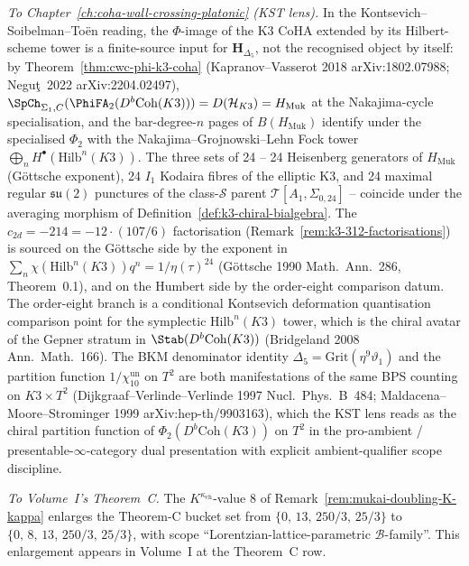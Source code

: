 \emph{To Chapter~\ref{ch:coha-wall-crossing-platonic} (KST lens).}
In the Kontsevich--Soibelman--To\"en reading,
the $\Phi$-image of the K3 CoHA extended by its Hilbert-scheme tower is a
finite-source input for $\mathbf{H}_{\Delta_5}$, not the recognised
object by itself: by
Theorem~\ref{thm:cwc-phi-k3-coha} (Kapranov--Vasserot 2018
\textup{arXiv:1802.07988}; Negu\c{t}~2022 \textup{arXiv:2204.02497}),
$\SpCh_{\Sigma_1, C}(\PhiFA_2(D^b\mathrm{Coh}(K3))) = D(\mathcal{H}_{K3}) = H_{\mathrm{Muk}}$
at the Nakajima-cycle specialisation, and the bar-degree-$n$ pages of $B(H_{\mathrm{Muk}})$ identify under the specialised $\Phi_2$
with the Nakajima--Grojnowski--Lehn Fock tower
$\bigoplus_n H^\bullet(\mathrm{Hilb}^n(K3))$. The three sets of 24 --
24 Heisenberg generators of $H_{\mathrm{Muk}}$ (G\"ottsche exponent),
24 $I_1$ Kodaira fibres of the elliptic K3, and 24 maximal regular
$\mathfrak{su}(2)$ punctures of the class-$\mathcal{S}$ parent
$\mathcal{T}[A_1,\Sigma_{0,24}]$ -- coincide under the averaging
morphism of Definition~\ref{def:k3-chiral-bialgebra}. The
$c_{2d} = -214 = -12\cdot(107/6)$ factorisation
(Remark~\ref{rem:k3-312-factorisations}) is
sourced on the G\"ottsche side by the exponent in
$\sum_n\chi(\mathrm{Hilb}^n(K3))q^n = 1/\eta(\tau)^{24}$
(G\"ottsche 1990 \textup{Math.~Ann.}~286, Theorem~0.1), and on the
Humbert side by the order-eight comparison datum. The
order-eight branch is a conditional Kontsevich deformation
quantisation comparison point for the symplectic
$\mathrm{Hilb}^n(K3)$ tower, which is the chiral avatar of the Gepner
stratum in $\Stab(D^b\mathrm{Coh}(K3))$ (Bridgeland 2008
\textup{Ann.~Math.}~166). The BKM denominator identity
$\Delta_5 = \mathrm{Grit}(\eta^9\vartheta_1)$ and the partition
function \(1/\chi_{10}^{\mathrm{un}}\) on $T^2$ are both manifestations of the
same BPS counting on $K3\times T^2$
(Dijkgraaf--Verlinde--Verlinde 1997 \textup{Nucl.~Phys.~B}~484;
Maldacena--Moore--Strominger 1999
\textup{arXiv:hep-th/9903163}), which the KST lens reads as the
chiral partition function of $\Phi_2(D^b\mathrm{Coh}(K3))$ on $T^2$
in the pro-ambient / presentable-$\infty$-category dual presentation
with explicit ambient-qualifier scope discipline.

\emph{To Volume~I's Theorem~C.} The $K^{\kappa_{\mathrm{ch}}}$-value $8$ of
Remark~\ref{rem:mukai-doubling-K-kappa} enlarges the Theorem-C bucket set from
$\{0,\, 13,\, 250/3,\, 25/3\}$ to $\{0,\, 8,\, 13,\, 250/3,\, 25/3\}$, with scope
``Lorentzian-lattice-parametric $\mathcal{B}$-family''. This enlargement appears in
Volume~I \cite{VolI} at the Theorem~C row.

